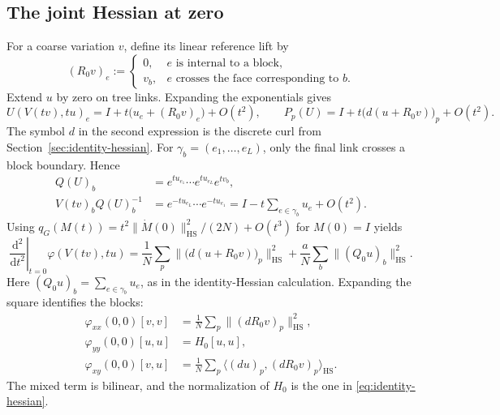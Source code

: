 \documentclass[10pt,reqno]{amsart}
\theoremstyle{definition}
\theoremstyle{remark}
\numberwithin{equation}{section}
\numberwithin{figure}{section}
\newcommand{\dd}{\mathrm d}
\begin{document}
\subsection{The joint Hessian at zero}
For a coarse variation $v$, define its linear reference lift by
\begin{equation}\label{eq:linear-reference-lift}
(R_0v)_e:=\begin{cases}
0,&e\text{ is internal to a block},\\
v_b,&e\text{ crosses the face corresponding to }b.
\end{cases}
\end{equation}
Extend $u$ by zero on tree links. Expanding the exponentials gives
\begin{equation}\label{eq:joint-link-linearization}
U(V(tv),tu)_e
=I+t\bigl(u_e+(R_0v)_e\bigr)+O(t^2),\qquad
P_p(U)=I+t\bigl(d(u+R_0v)\bigr)_p+O(t^2).
\end{equation}
The symbol $d$ in the second expression is the discrete curl from
Section~\ref{sec:identity-hessian}.
For $\gamma_b=(e_1,\ldots,e_L)$, only the final link crosses a block
boundary. Hence
\begin{equation}\label{eq:joint-blocking-linearization}
\begin{aligned}
Q(U)_b&=e^{tu_{e_1}}\cdots e^{tu_{e_L}}e^{tv_b},\\
V(tv)_bQ(U)_b^{-1}
&=e^{-tu_{e_L}}\cdots e^{-tu_{e_1}}
=I-t\sum_{e\in\gamma_b}u_e+O(t^2).
\end{aligned}
\end{equation}
Using $q_G(M(t))=t^2\|\dot M(0)\|_{\mathrm{HS}}^2/(2N)+O(t^3)$
for $M(0)=I$ yields
\begin{equation}\label{eq:joint-hessian-quadratic-form}
\boxed{\left.\frac{\dd^2}{\dd t^2}\right|_{t=0}
\varphi(V(tv),tu)
=\frac1N\sum_p\|\bigl(d(u+R_0v)\bigr)_p\|_{\mathrm{HS}}^2
+\frac aN\sum_b\|(Q_0u)_b\|_{\mathrm{HS}}^2.}
\end{equation}
Here $(Q_0u)_b=\sum_{e\in\gamma_b}u_e$, as in the identity-Hessian
calculation. Expanding the square identifies the blocks:
\begin{equation}\label{eq:joint-hessian-blocks}
\begin{aligned}
\varphi_{xx}(0,0)[v,v]
&=\frac1N\sum_p\|(dR_0v)_p\|_{\mathrm{HS}}^2,\\
\varphi_{yy}(0,0)[u,u]&=H_0[u,u],\\
\varphi_{xy}(0,0)[v,u]
&=\frac1N\sum_p\langle(du)_p,(dR_0v)_p\rangle_{\mathrm{HS}}.
\end{aligned}
\end{equation}
The mixed term is bilinear, and the normalization of $H_0$ is the one
in \eqref{eq:identity-hessian}.
\end{document}
